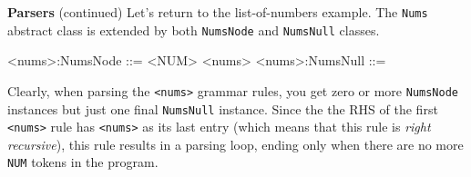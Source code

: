 \begin{minipage}[t]{\sw}
\slidenumber
\LARGE
{\bf Parsers} (continued)\exx
Let's return to the list-of-numbers example.\exx
\Large
\emm\LightBox{\MYlonGrammarTOK}\exx
\LARGE
The \verb'Nums' abstract class is extended
by both \verb'NumsNode' and \verb'NumsNull' classes.
\Large
\begin{qv}
<nums>:NumsNode ::= <NUM> <nums>
<nums>:NumsNull ::=
\end{qv}
\LARGE
Clearly, when parsing the \verb'<nums>' grammar rules,
you get zero or more \verb'NumsNode' instances
but just one final \verb'NumsNull' instance.
Since the the RHS of the first \verb'<nums>' rule
has \verb'<nums>' as its last entry
(which means that this rule is {\em right recursive}),
this rule results in a parsing loop,
ending only when there are no more \verb'NUM' tokens in the program.\exx
\end{minipage}
\clearpage

